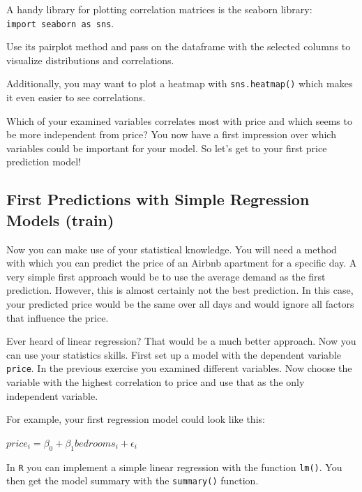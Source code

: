 \documentclass[
  11pt,
]{article}
\newenvironment{tips}[1]
  {
  \begin{itemize}
  \footnotesize
  \renewcommand{\labelitemi}{
    \raisebox{-.7\height}[0pt][0pt]{
      {\setkeys{Gin}{width=3em,keepaspectratio}
        \texttt{[image: images/\#1.png]}}
    }
  }
  \setlength{\fboxsep}{1em}
  \begin{rbox}
  \item
  }
  {
  \end{rbox}
  \end{itemize}
  }
\newenvironment{tipsp}[1]
  {
  \begin{itemize}
  \footnotesize
  \renewcommand{\labelitemi}{
    \raisebox{-.7\height}[0pt][0pt]{
      {\setkeys{Gin}{width=3em,keepaspectratio}
        \texttt{[image: images/\#1.png]}}
    }
  }
  \setlength{\fboxsep}{1em}
  \begin{pbox}
  \item
  }
  {
  \end{pbox}
  \end{itemize}
  }
\begin{document}
\begin{tipsp}p

A handy library for plotting correlation matrices is the seaborn library: \texttt{import\ seaborn\ as\ sns}.

Use its pairplot method and pass on the dataframe with the selected columns to visualize distributions and correlations.

Additionally, you may want to plot a heatmap with \texttt{sns.heatmap()} which makes it even easier to see correlations.

\end{tipsp}

Which of your examined variables correlates most with price and which seems to be more independent from price? You now have a first impression over which variables could be important for your model. So let's get to your first price prediction model!

\hypertarget{first-predictions-with-simple-regression-models-train}{%
\subsection{First Predictions with Simple Regression Models (train)}\label{first-predictions-with-simple-regression-models-train}}

Now you can make use of your statistical knowledge. You will need a method with which you can predict the price of an Airbnb apartment for a specific day. A very simple first approach would be to use the average demand as the first prediction. However, this is almost certainly not the best prediction. In this case, your predicted price would be the same over all days and would ignore all factors that influence the price.

Ever heard of linear regression? That would be a much better approach. Now you can use your statistics skills. First set up a model with the dependent variable \texttt{price}. In the previous exercise you examined different variables. Now choose the variable with the highest correlation to price and use that as the only independent variable.

For example, your first regression model could look like this:

\(price_i = \beta_0 + \beta_1 bedrooms_i + \epsilon_i\)

\begin{tips}r

In \texttt{R} you can implement a simple linear regression with the function \texttt{lm()}. You then get the model summary with the \texttt{summary()} function.

\end{tips}
\end{document}
